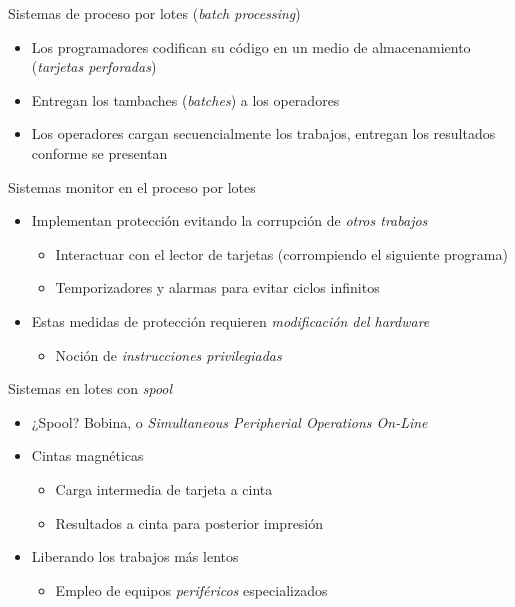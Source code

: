 \documentclass[presentation]{beamer}
\begin{document}
\begin{frame}[label={sec:org3b0901a}]{Sistemas de proceso por lotes (\emph{batch processing})}
\begin{itemize}
\item Los programadores codifican su código en un medio de almacenamiento
(\emph{tarjetas perforadas})
\item Entregan los tambaches (\emph{batches}) a los operadores
\item Los operadores cargan secuencialmente los trabajos, entregan los
resultados conforme se presentan
\end{itemize}
\end{frame}

\begin{frame}[label={sec:org1566b45}]{Sistemas monitor en el proceso por lotes}
\begin{itemize}
\item Implementan protección evitando la corrupción de \emph{otros trabajos}
\begin{itemize}
\item Interactuar con el lector de tarjetas (corrompiendo el siguiente
programa)
\item Temporizadores y alarmas para evitar ciclos infinitos
\end{itemize}
\item Estas medidas de protección requieren \emph{modificación del hardware}
\begin{itemize}
\item Noción de \emph{instrucciones privilegiadas}
\end{itemize}
\end{itemize}
\end{frame}

\begin{frame}[label={sec:orgcac3de4}]{Sistemas en lotes con \emph{spool}}
\begin{itemize}
\item ¿Spool? Bobina, o \emph{Simultaneous Peripherial Operations On-Line}
\item Cintas magnéticas
\begin{itemize}
\item Carga intermedia de tarjeta a cinta
\item Resultados a cinta para posterior impresión
\end{itemize}
\item Liberando los trabajos más lentos
\begin{itemize}
\item Empleo de equipos \emph{periféricos} especializados
\end{itemize}
\end{itemize}
\end{frame}
\end{document}
